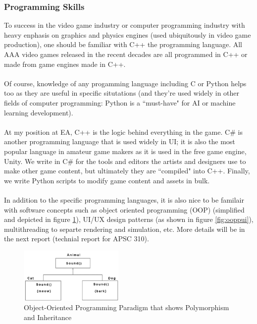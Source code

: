 \documentclass[10pt,letterpaper]{article}
\begin{document}
\subsubsection{Programming Skills}

To success in the video game industry or computer programming industry with heavy enphasis on graphics and physics engines (used ubiquitously in video game production), one should be familiar with C++ the programming language. All AAA video games released in the recent decades are all programmed in C++ or made from game engines made in C++.\\
\\
Of course, knowledge of any progamming language including C or Python helps too as they are useful in specific situtations (and they're used widely in other fields of computer programming: Python is a ``must-have" for AI or machine learning development).\\
\\
At my position at EA, C++ is the logic behind everything in the game. C\# is another programming language that is used widely in UI; it is also the most popular language in amateur game makers as it is used in the free game engine, Unity. We write in C\# for the tools and editors the artists and designers use to make other game content, but ultimately they are ``compiled" into C++. Finally, we write Python scripts to modify game content and assets in bulk.\\
\\
In addition to the specific programming languages, it is also nice to be familair with software concepts such as object oriented programming (OOP) (simplified and depicted in figure \ref{fig:oopp}), UI/UX design patterns (as shown in figure \ref{fig:ooppui}), multithreading to separte rendering and simulation, etc. More details will be in the next report (technial report for APSC 310).\\

\begin{figure}[H]
	\centering
	\includegraphics[width=0.45\textwidth]{assets/oopp}
	\caption{Object-Oriented Programming Paradigm that shows Polymorphism and Inheritance\cite{oopp}}
	\label{fig:oopp}
\end{figure}
\end{document}
